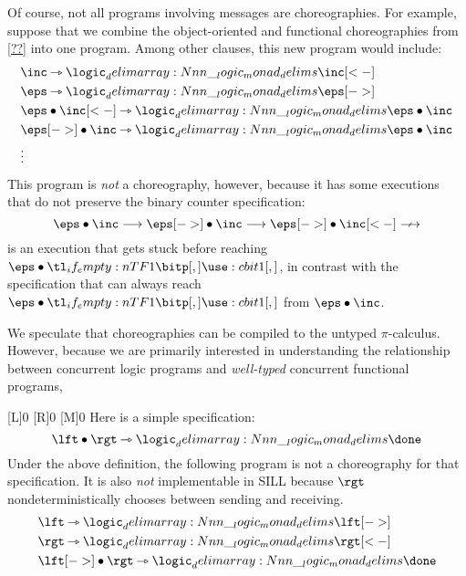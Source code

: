 Of course, not all programs involving messages are choreographies.
For example, suppose that we combine the object-oriented and functional choreographies from \cref{??} into one program.
Among other clauses, this new program would include:
\begin{align*}
  &\inc \lrimp \monad{\inc[<-]} \\
  &\eps \lrimp \monad{\eps[->]} \\
  &\eps \fuse \inc[<-] \lrimp \monad{\eps \fuse \inc} \\
  &\eps[->] \fuse \inc \lrimp \monad{\eps \fuse \inc} \\
  &\vdots
\end{align*}
This program is \emph{not} a choreography, however, because it has some executions that do not preserve the binary counter specification:
\begin{equation*}
  \eps \fuse \inc
    \trans \eps[->] \fuse \inc
    \trans \eps[->] \fuse \inc[<-]
    \ntrans
\end{equation*}
is an execution that gets stuck before reaching $\eps \fuse \bit{1}$, in contrast with the specification that can always reach $\eps \fuse \bit{1}$ from $\eps \fuse \inc$.


We speculate that choreographies can be compiled to the untyped $\pi$-calculus.
However, because we are primarily interested in understanding the relationship between concurrent logic programs and \emph{well-typed} concurrent functional programs, 





\NewPredicate{\lft}[L]{0}%
\NewPredicate{\rgt}[R]{0}%
\NewPredicate{\mdl}[M]{0}%
%
Here is a simple specification:
\begin{equation*}
  \lft \fuse \rgt \lrimp \monad{\done}
\end{equation*}
Under the above definition, the following program is not a choreography for that specification.
It is also \emph{not} implementable in \ac{SILL} because $\rgt$ nondeterministically chooses between sending and receiving.
\begin{align*}
  &\lft \lrimp \monad{\lft[->]} \\
  &\rgt \lrimp \monad{\rgt[<-]} \\
  &\lft[->] \fuse \rgt \lrimp \monad{\done} 
\end{align*}

